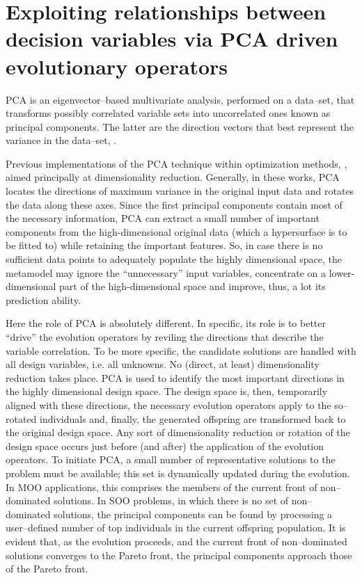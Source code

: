 \section{Exploiting relationships between decision variables via PCA driven evolutionary operators}
PCA is an eigenvector--based multivariate analysis, performed on a data--set, that transforms possibly correlated variable sets into uncorrelated ones known as principal components. The latter are the direction vectors that best represent the variance in the data--set, \cite{Haykin,Jolliffe_2002}.

Previous implementations of the PCA technique within optimization methods, \cite{Fodor_2002, Ghisu_2010}, aimed principally at dimensionality reduction. Generally, in these works, PCA locates the directions of maximum variance in the original input data and rotates the data along these axes. Since the first principal components contain most of the necessary information, PCA can extract a small number of important components from the high-dimensional original data (which a hypersurface is to be fitted to) while retaining the important features. So, in case there is no sufficient data points to adequately populate the highly dimensional space, the metamodel may ignore the ``unnecessary'' input variables, concentrate on a lower-dimensional part of the high-dimensional space and improve, thus, a lot its prediction ability. 

Here the role of PCA is absolutely different. In specific, its role is to better ``drive'' the evolution operators by reviling the directions that describe the variable correlation.  
To be more specific, the candidate solutions are handled with all design variables, i.e. all unknowns. No (direct, at least) dimensionality reduction takes place. PCA is used to identify the most important directions in the highly dimensional design space. The design space is, then, temporarily aligned with these directions, the necessary evolution operators apply to the so--rotated individuals and, finally, the generated offspring are transformed back to the original design space. Any sort of dimensionality reduction or rotation of the design space occurs just before (and after) the application of the evolution operators. To initiate PCA, a small number of representative solutions to the problem must be available; this set is dynamically updated during the evolution. In MOO applications, this comprises the members of the current front of non--dominated solutions. In SOO problems, in which there is no set of non--dominated solutions, the principal components can be found by processing a user--defined number of top individuals in the current offspring population. It is evident that, as the evolution proceeds, and the current front of non--dominated solutions converges to the Pareto front, the principal components approach those of the Pareto front. 

